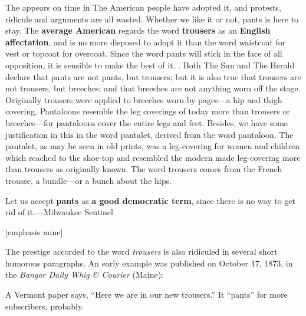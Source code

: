\begin{ipquote}
\begin{center}
\end{center}
The  appears on time in  The American people have adopted it, and protests, ridicule and arguments are all wasted. Whether we like it or not, pants is here to stay. The \textbf{average American} regards the word \textbf{trousers} as an \textbf{English affectation}, and is no more disposed to adopt it than the word waistcoat for vest or topcoat for overcoat. Since the word pants will stick in the face of all opposition, it is sensible to make the best of it. . Both The Sun and The Herald declare that pants are not pants, but trousers; but it is also true that trousers are not trousers, but breeches; and that breeches are not anything worn off the stage. Originally trousers were applied to breeches worn by pages—a hip and thigh covering. Pantaloons resemble the leg coverings of today more than trousers or breeches—for pantaloons cover the entire legs and feet.  Besides, we have some justification in this in the word pantalet, derived from the word pantaloon. The pantalet, as may be seen in old prints, was a leg-covering for women and children which reached to the sho{\kern0pt}e-top and resembled the modern made leg-covering more than trousers as originally known. The word trousers comes from the French trousse, a bundle—or a bunch about the hips.

{Let us accept \textbf{pants} as \textbf{a good democratic term}, since there is no way to get rid of it.—Milwaukee Sentinel

\raggedleft
{[emphasis mine]}\\
}
\end{ipquote}


The prestige accorded to the word \emph{trousers} is also ridiculed in several short humorous paragraphs. An early example was published on October 17, 1873, in the \emph{Bangor Daily Whig \& Courier} (Maine):


\begin{ipquote}
A Vermont paper says, “Here we are in our new trousers.” It “pants” for more subscribers, probably.
\end{ipquote}


